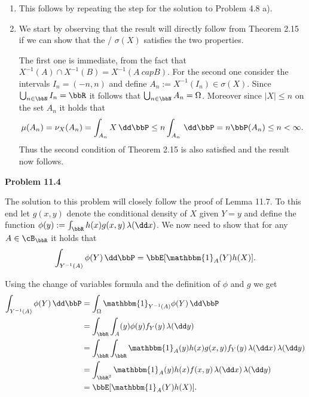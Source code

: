\begin{enumerate}[label={(\alph*)}]
\item This follows by repeating the step for the solution to Problem 4.8 a). 
%

\item We start by observing that the result will directly follow from Theorem 2.15 if we can show that the \sigalg/ $\sigma(X)$ satisfies the two properties.

The first one is immediate, from the fact that $X^{-1}(A) \cap X^{-1}(B) = X^{-1}(A\ cap B)$. For the second one consider the intervals $I_n = (-n,n)$ and define $A_n := X^{-1}(I_n) \in \sigma(X)$. Since $\bigcup_{n \in \bbN} I_n = \bbR$ it follows that $\bigcup_{n \in \bbN} A_n = \Omega$. Moreover since $|X| \le n$ on the set $A_n$ it holds that
\[
	\mu(A_n) = \nu_X(A_n) = \int_{A_n} X \, \dd \bbP \le n \int_{A_n} \, \dd \bbP = n \bbP(A_n) \le n < \infty.
\]
Thus the second condition of Theorem 2.15 is also satisfied and the result now follows.

	
\end{enumerate}

\bigskip

\textbf{Problem 11.4}

The solution to this problem will closely follow the proof of Lemma 11.7. To this end let $g(x,y)$ denote the conditional density of $X$ given $Y = y$ and define the function $\phi(y) := \int_\bbR h(x) g(x,y) \, \lambda(\dd x)$. We now need to show that for any $A \in \cB_\bbR$ it holds that
\[
	\int_{Y^{-1}(A)} \phi(Y) \, \dd \bbP = \bbE[\mathbbm{1}_A(Y) h(X)].
\]

Using the change of variables formula and the definition of $\phi$ and $g$ we get
\begin{align*}
	\int_{Y^{-1}(A)} \phi(Y) \, \dd \bbP &= \int_\Omega \mathbbm{1}_{Y^{-1}(A)} \phi(Y) \, \dd \bbP\\
	&= \int_\bbR \int_A(y) \phi(y) f_Y(y) \, \lambda(\dd y)\\
	&= \int_{\bbR} \int_\bbR \mathbbm{1}_A(y) h(x) g(x,y) f_Y(y)  \, \lambda(\dd x) \, \lambda(\dd y)\\
	&= \int_{\bbR^2} \mathbbm{1}_{A}(y) h(x) f(x,y) \, \lambda(\dd x) \, \lambda(\dd y)\\
	&= \bbE[\mathbbm{1}_{A}(Y) h(X)].
\end{align*}



